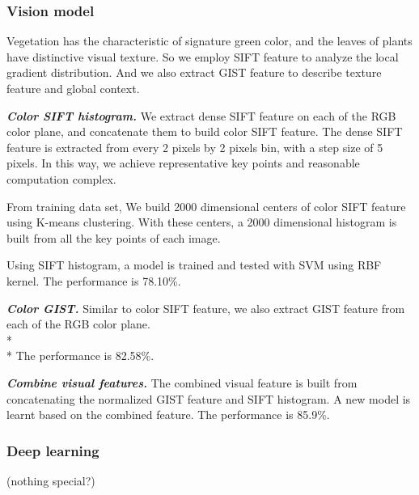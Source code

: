 \subsubsection*{Vision model}
Vegetation has the characteristic of signature green color, and the leaves of plants have distinctive visual texture. So we employ SIFT feature to analyze the local gradient distribution. And we also extract GIST feature to describe texture feature and global context. 


\textbf{\textit{Color SIFT histogram.}}
We extract dense SIFT feature on each of the RGB color plane, and concatenate them to build color SIFT feature. The dense SIFT feature is extracted from every 2 pixels by 2 pixels bin, with a step size of 5 pixels. In this way, we achieve representative key points and reasonable computation complex. 

From training data set, We build 2000 dimensional centers of color SIFT feature using K-means clustering. With these centers, a 2000 dimensional histogram is built from all the key points of each image.

Using SIFT histogram, a model is trained and tested with SVM using RBF kernel. 
The performance is 78.10\%.

\textbf{\textit{Color GIST.}}
Similar to color SIFT feature, we also extract GIST feature from each of the RGB color plane.\\*\\*
The performance is 82.58\%.

\textbf{\textit{Combine visual features.}}
The combined visual feature is built from concatenating the normalized GIST feature and SIFT histogram. A new model is learnt based on the combined feature.
The performance is 85.9\%.

\subsubsection*{Deep learning}
(nothing special?)




